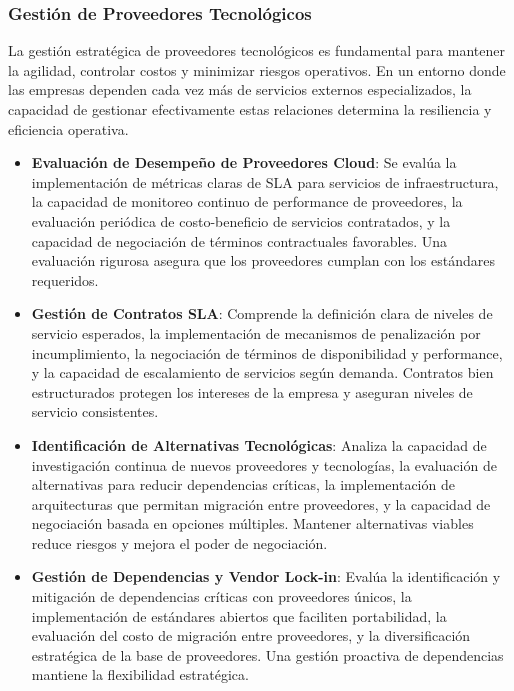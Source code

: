 \subsubsection{Gestión de Proveedores Tecnológicos}

La gestión estratégica de proveedores tecnológicos es fundamental para mantener la agilidad, controlar costos y minimizar riesgos operativos. En un entorno donde las empresas dependen cada vez más de servicios externos especializados, la capacidad de gestionar efectivamente estas relaciones determina la resiliencia y eficiencia operativa.

\begin{itemize}
\item \textbf{Evaluación de Desempeño de Proveedores Cloud}: Se evalúa la implementación de métricas claras de SLA para servicios de infraestructura, la capacidad de monitoreo continuo de performance de proveedores, la evaluación periódica de costo-beneficio de servicios contratados, y la capacidad de negociación de términos contractuales favorables. Una evaluación rigurosa asegura que los proveedores cumplan con los estándares requeridos.

\item \textbf{Gestión de Contratos SLA}: Comprende la definición clara de niveles de servicio esperados, la implementación de mecanismos de penalización por incumplimiento, la negociación de términos de disponibilidad y performance, y la capacidad de escalamiento de servicios según demanda. Contratos bien estructurados protegen los intereses de la empresa y aseguran niveles de servicio consistentes.

\item \textbf{Identificación de Alternativas Tecnológicas}: Analiza la capacidad de investigación continua de nuevos proveedores y tecnologías, la evaluación de alternativas para reducir dependencias críticas, la implementación de arquitecturas que permitan migración entre proveedores, y la capacidad de negociación basada en opciones múltiples. Mantener alternativas viables reduce riesgos y mejora el poder de negociación.

\item \textbf{Gestión de Dependencias y Vendor Lock-in}: Evalúa la identificación y mitigación de dependencias críticas con proveedores únicos, la implementación de estándares abiertos que faciliten portabilidad, la evaluación del costo de migración entre proveedores, y la diversificación estratégica de la base de proveedores. Una gestión proactiva de dependencias mantiene la flexibilidad estratégica.
\end{itemize}

